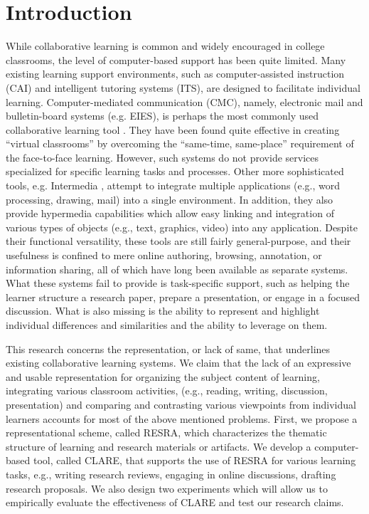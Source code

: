 \section{Introduction}
\label{sec:introduction}

While collaborative learning is common and widely encouraged in college
classrooms, the level of computer-based support has been quite limited.
Many existing learning support environments, such as computer-assisted
instruction (CAI) and intelligent tutoring systems (ITS), are designed to
facilitate individual learning.  Computer-mediated communication (CMC),
namely, electronic mail and bulletin-board systems (e.g. EIES), is perhaps
the most commonly used collaborative learning tool
\cite{HILTZ88Collaborative}. They have been found quite effective in
creating ``virtual classrooms'' by overcoming the ``same-time, same-place''
requirement of the face-to-face learning.  However, such systems do not
provide services specialized for specific learning tasks and processes.
Other more sophisticated tools, e.g.  Intermedia \cite{Yankelovich88},
attempt to integrate multiple applications (e.g., word processing, drawing,
mail) into a single environment. In addition, they also provide hypermedia
capabilities which allow easy linking and integration of various types of
objects (e.g., text, graphics, video) into any application. Despite their
functional versatility, these tools are still fairly general-purpose, and
their usefulness is confined to mere online authoring, browsing,
annotation, or information sharing, all of which have long been available
as separate systems.  What these systems fail to provide is task-specific
support, such as helping the learner structure a research paper, prepare a
presentation, or engage in a focused discussion.  What is also missing is
the ability to represent and highlight individual differences and
similarities and the ability to leverage on them.

This research concerns the representation, or lack of same, that underlines
existing collaborative learning systems. We claim that the lack of an
expressive and usable representation for organizing the subject content of
learning, integrating various classroom activities, (e.g., reading,
writing, discussion, presentation) and comparing and contrasting various
viewpoints from individual learners accounts for most of the above
mentioned problems.  First, we propose a representational scheme, called
RESRA, which characterizes the thematic structure of learning and research
materials or artifacts.  We develop a computer-based tool, called CLARE,
that supports the use of RESRA for various learning tasks, e.g., writing
research reviews, engaging in online discussions, drafting research
proposals.  We also design two experiments which will allow us to
empirically evaluate the effectiveness of CLARE and test our research
claims.

